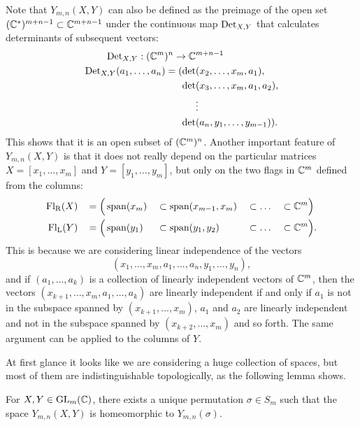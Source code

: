 Note that $Y_{m,n}(X,Y)$ can also be defined as the
preimage of the open set $(\mathbb{C}^*)^{m+n-1}\subset \mathbb{C}^{m+n-1}$ under the
continuous map $\operatorname{Det}_{X,Y}$ that calculates determinants of subsequent
vectors:
\begin{align*}
  \operatorname{Det}_{X,Y} : (\mathbb{C}^m)^n \to \mathbb{C}&^{m+n-1} \\
  \operatorname{Det}_{X,Y}(a_1,\dots,a_n) = (\det&(x_2,\dots,x_m,a_1),\\
  \det&(x_3,\dots,x_m,a_1,a_2), \\
                              &\vdots\\
  \det&(a_n,y_1,\dots,y_{m-1})).
\end{align*}
This shows that it is an open subset of $(\mathbb{C}^m)^n$. Another important
feature of $Y_{m,n}(X,Y)$ is that it does not really depend on the
particular matrices $X = [x_1,\dots,x_m]$ and $Y = [y_1,\dots,y_m]$,
but
only on the two flags in $\mathbb{C}^{m}$ 
defined from the columns: 
\begin{alignat*}{5}
  \mathrm{Fl_R}(X)\, &&= \Big(&\operatorname{span}(x_m) &&\subset \operatorname{span}(x_{m-1},x_m) &&\subset
  \dots &&\subset \mathbb{C}^m\Big) \\
  \mathrm{Fl_L}(Y)\, &&= \Big(&\operatorname{span}(y_1) &&\subset \operatorname{span}(y_1,y_2) &&\subset
  \dots &&\subset \mathbb{C}^m\Big).
\end{alignat*}
This is because we are considering linear independence of the vectors
\[ (x_1,\dots,x_m,a_1,\dots,a_n,y_1,\dots,y_n), \]
and if $(a_1,\dots,a_{k})$ is a collection of linearly independent
vectors of $\mathbb{C}^m$, then the vectors
$(x_{k+1},\dots,x_m,a_1,\dots,a_{k})$ are
linearly independent if and only if $a_1$ is not in the subspace
spanned by $(x_{k+1},\dots,x_m)$, $a_1$ and $a_2$ are linearly
independent and not in the
subspace spanned by $(x_{k+2},\dots,x_m)$ and so forth. The same
argument can be applied to the columns of $Y$.

At first glance it looks like we are considering a huge collection of
spaces, but most of them are indistinguishable topologically, as the
following lemma shows.

\begin{lemma} \label{lem:rum-perm}
  For $X,Y\in \operatorname{GL}_m(\mathbb{C})$, there exists a unique permutation $\sigma
  \in S_m$  such that the space
  $Y_{m,n}(X,Y)$ is homeomorphic to $Y_{m,n}(\sigma)$.
\end{lemma}

